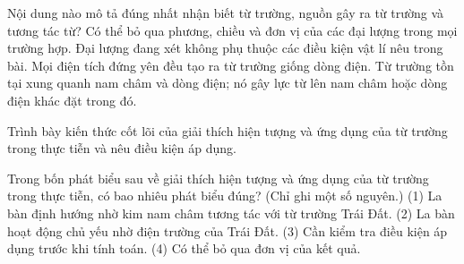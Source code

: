 \begin{ex}
Nội dung nào mô tả đúng nhất nhận biết từ trường, nguồn gây ra từ trường và tương tác từ?
\choice
{Có thể bỏ qua phương, chiều và đơn vị của các đại lượng trong mọi trường hợp.}
{Đại lượng đang xét không phụ thuộc các điều kiện vật lí nêu trong bài.}
{Mọi điện tích đứng yên đều tạo ra từ trường giống dòng điện.}
{\True Từ trường tồn tại xung quanh nam châm và dòng điện; nó gây lực từ lên nam châm hoặc dòng điện khác đặt trong đó.}
\end{ex}

\begin{bt}
Trình bày kiến thức cốt lõi của giải thích hiện tượng và ứng dụng của từ trường trong thực tiễn và nêu điều kiện áp dụng.
\end{bt}

\begin{ex}
Trong bốn phát biểu sau về giải thích hiện tượng và ứng dụng của từ trường trong thực tiễn, có bao nhiêu phát biểu đúng? (Chỉ ghi một số nguyên.) (1) La bàn định hướng nhờ kim nam châm tương tác với từ trường Trái Đất. (2) La bàn hoạt động chủ yếu nhờ điện trường của Trái Đất. (3) Cần kiểm tra điều kiện áp dụng trước khi tính toán. (4) Có thể bỏ qua đơn vị của kết quả.
\end{ex}

